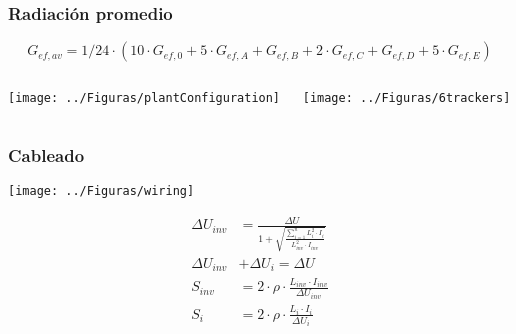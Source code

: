\documentclass[serif, xcolor=dvipsnames]{beamer}
\begin{document}
\begin{frame}[plain]
  \frametitle{Radiación promedio}

  \begin{equation*}
    G_{ef, av} = 1/24 \cdot \left( 10 \cdot G_{ef,0} + 5 \cdot G_{ef,A}
      + G_{ef,B} + 2 \cdot G_{ef,C} + G_{ef,D} + 5 \cdot G_{ef,E} \right)
  \end{equation*}

  \begin{columns}

    \begin{column}{4cm}
      \begin{center}
        \texttt{[image: ../Figuras/plantConfiguration]}
      \end{center}
    \end{column}

    \begin{column}{6cm}
      \texttt{[image: ../Figuras/6trackers]}

    \end{column}
  \end{columns}


\end{frame}

\begin{frame}[plain]
  \frametitle{Cableado}

  \begin{center}
    \texttt{[image: ../Figuras/wiring]}
  \end{center}

  \begin{align*}
    \Delta U_{inv} &= \frac{\Delta U}{1+\sqrt{\frac{\sum_{i=1}^n
          L_{i}^2 \cdot I_{i}}{L_{inv}^2 \cdot I_{inv}}}} \\
    \Delta U_{inv} &+ \Delta U_i = \Delta U\\
    S_{inv} &= 2 \cdot \rho \cdot \frac{L_{inv} \cdot
      I_{inv}}{\Delta U_{inv}} \\
    S_{i} &= 2 \cdot \rho \cdot \frac{L_{i} \cdot I_i}{\Delta U_i}
  \end{align*}


\end{frame}
\end{document}

